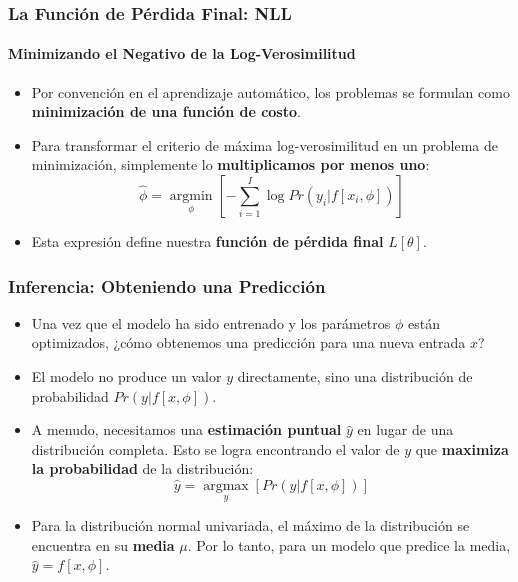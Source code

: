 \documentclass[aspectratio=169, 10pt]{beamer}
\begin{document}
\begin{frame}
	\frametitle{La Función de Pérdida Final: NLL}
	\framesubtitle{Minimizando el Negativo de la Log-Verosimilitud}
	\begin{itemize}
		\item Por convención en el aprendizaje automático, los problemas se formulan como \textbf{minimización de una función de costo}.
		\item Para transformar el criterio de máxima log-verosimilitud en un problema de minimización, simplemente lo \textbf{multiplicamos por menos uno}:
		\begin{equation*}
			\hat{\phi} = \underset{\phi}{\operatorname{argmin}} \left[ -\sum_{i=1}^{I} \log Pr(y_i|f[x_i, \phi]) \right] \tag{5.4}
		\end{equation*}
		\item Esta expresión define nuestra \textbf{función de pérdida final} $L[\theta]$.
	\end{itemize}
\end{frame}

\begin{frame}
	\frametitle{Inferencia: Obteniendo una Predicción}
	\begin{itemize}
		\item Una vez que el modelo ha sido entrenado y los parámetros \(\phi\) están optimizados, ¿cómo obtenemos una predicción para una nueva entrada $x$?
		\item El modelo no produce un valor $y$ directamente, sino una distribución de probabilidad \(Pr(y|f[x, \phi])\).
		\item A menudo, necesitamos una \textbf{estimación puntual} \(\hat{y}\) en lugar de una distribución completa. Esto se logra encontrando el valor de $y$ que \textbf{maximiza la probabilidad} de la distribución:
		\begin{equation*}
			\hat{y} = \underset{y}{\operatorname{argmax}} [Pr(y|f[x, \phi])] \tag{5.5}
		\end{equation*}
		\item Para la distribución normal univariada, el máximo de la distribución se encuentra en su \textbf{media} \(\mu\). Por lo tanto, para un modelo que predice la media, \(\hat{y} = f[x, \phi]\).
	\end{itemize}
\end{frame}
\end{document}
